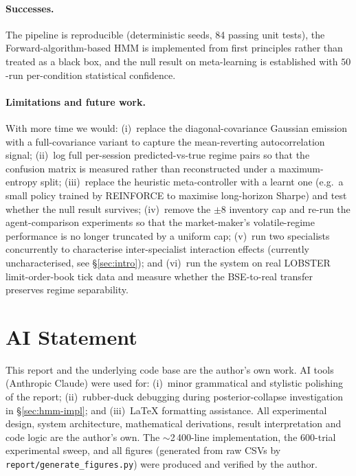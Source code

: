 \documentclass[11pt,a4paper]{article}
\begin{document}
\paragraph{Successes.}
The pipeline is reproducible (deterministic seeds, 84 passing unit tests),
the Forward-algorithm-based HMM is implemented from first principles rather
than treated as a black box, and the null result on meta-learning is
established with $50$-run per-condition statistical confidence.

\paragraph{Limitations and future work.}
With more time we would: (i)~replace the diagonal-covariance Gaussian
emission with a full-covariance variant to capture the mean-reverting
autocorrelation signal; (ii)~log full per-session predicted-vs-true regime
pairs so that the confusion matrix is measured rather than reconstructed
under a maximum-entropy split; (iii)~replace the heuristic meta-controller
with a learnt one (e.g.\ a small policy trained by REINFORCE to maximise
long-horizon Sharpe) and test whether the null result survives;
(iv)~remove the $\pm 8$ inventory cap and re-run the agent-comparison
experiments so that the market-maker's volatile-regime performance is no
longer truncated by a uniform cap; (v)~run two specialists concurrently
to characterise inter-specialist interaction effects (currently
uncharacterised, see \S\ref{sec:intro}); and (vi)~run the system on real
LOBSTER limit-order-book tick data and measure whether the BSE-to-real
transfer preserves regime separability.


\section*{AI Statement}
This report and the underlying code base are the author's own work. AI tools
(Anthropic Claude) were used for: (i)~minor grammatical and stylistic
polishing of the report; (ii)~rubber-duck debugging during posterior-collapse
investigation in \S\ref{sec:hmm-impl}; and (iii)~LaTeX formatting assistance.
All experimental design, system architecture, mathematical derivations,
result interpretation and code logic are the author's own. The
$\sim$2\,400-line implementation, the 600-trial experimental sweep, and all
figures (generated from raw CSVs by
\texttt{report/generate\_figures.py}) were produced and verified by the
author.
\end{document}
